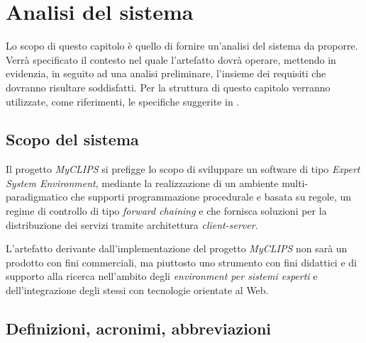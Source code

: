 
\chapter{Analisi del sistema}

Lo scopo di questo capitolo è quello di fornire un'analisi del sistema da proporre. Verrà specificato il contesto nel quale l'artefatto dovrà operare, mettendo in evidenzia, in seguito ad una analisi preliminare, l'insieme dei requisiti che dovranno risultare soddisfatti. Per la struttura di questo capitolo verranno utilizzate, come riferimenti, le specifiche suggerite in \cite{ieee830-1998}.

\section{Scopo del sistema}

Il progetto \emph{MyCLIPS} si prefigge lo scopo di sviluppare un software di tipo \emph{Expert System Environment}, mediante la realizzazione di un ambiente multi-paradigmatico che supporti programmazione procedurale e basata su regole, un regime di controllo di tipo \emph{forward chaining} e che fornisca soluzioni per la distribuzione dei servizi tramite architettura \emph{client-server}.

L'artefatto derivante dall'implementazione del progetto \emph{MyCLIPS} non sarà un prodotto con fini commerciali, ma piuttosto uno strumento con fini didattici e di supporto alla ricerca nell'ambito degli \emph{environment per sistemi esperti} e dell'integrazione degli stessi con tecnologie orientate al Web.

\section{Definizioni, acronimi, abbreviazioni}

